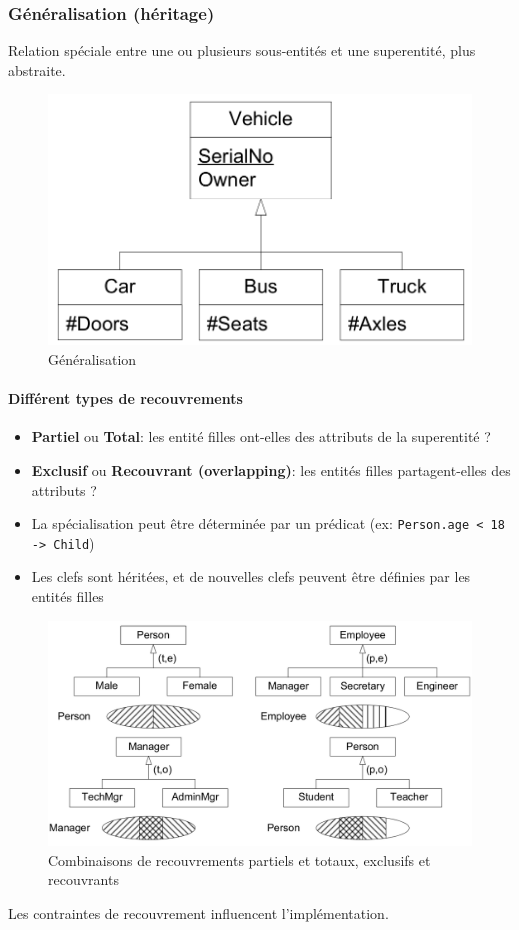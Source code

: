 \documentclass[a4paper]{article}
\begin{document}
\subsubsection{Généralisation (héritage)}
Relation spéciale entre une ou plusieurs sous-entités et une superentité, plus abstraite.

\begin{figure}[H]
    \center
    \includegraphics[width=.3\textwidth]{fig/generalisation.png}
    \caption{Généralisation}
\end{figure}

\paragraph{Différent types de recouvrements}
\begin{itemize}
  \item \textbf{Partiel} ou \textbf{Total}: les entité filles ont-elles des attributs de la superentité ?
  \item \textbf{Exclusif} ou \textbf{Recouvrant (overlapping)}: les entités filles partagent-elles des attributs ?
  \item La spécialisation peut être déterminée par un prédicat (ex: \texttt{Person.age < 18 -> Child})
  \item Les clefs sont héritées, et de nouvelles clefs peuvent être définies par les entités filles
\end{itemize}
\begin{figure}[H]
    \center
    \includegraphics[width=.6\textwidth]{fig/generalisation-cov.png}
    \caption{Combinaisons de recouvrements partiels et totaux, exclusifs et recouvrants}
\end{figure}

Les contraintes de recouvrement influencent l'implémentation.
\end{document}
